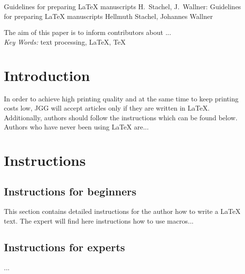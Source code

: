 \documentclass[12pt,twoside]{article}
\begin{document}
\begin{JGGarticle}
        {Guidelines for preparing LaTeX manuscripts}
        {H.\ Stachel, J.\ Wallner: Guidelines for preparing LaTeX manuscripts}
        {Hellmuth Stachel, Johannes Wallner}
        {}
\begin{JGGabstract}
        The aim of this paper is to inform contributors about ...
        \\[1mm]{\em Key Words:} text processing, LaTeX, TeX
\end{JGGabstract}

\section{Introduction}
        In order to achieve high printing quality and at the
        same time to keep printing costs low, JGG will accept
        articles only if they are written in LaTeX. Additionally,
        authors should follow the instructions which can be found
        below. Authors who have never been using LaTeX are...
\section{Instructions}
\subsection*{Instructions for beginners}
        This section contains detailed instructions for the
        author how to write a LaTeX text.  The expert
        will find here instructions how to use macros...
\subsection{Instructions for experts}
	...
\end{JGGarticle}
\end{document}
